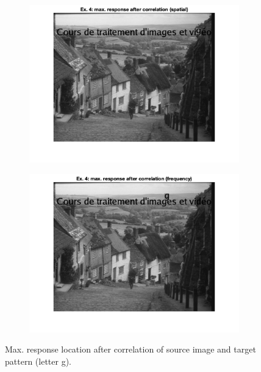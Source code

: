 \documentclass{article}
\begin{document}
\begin{figure}
    \centering
    \begin{subfigure}[c]{0.49\textwidth}
        \includegraphics[width=\textwidth]{images/corr_spatial.png}
    \end{subfigure}
    \hfill
    \begin{subfigure}[c]{0.49\textwidth}
        \includegraphics[width=\textwidth]{images/corr_freq.png}
    \end{subfigure}
    \caption{Max. response location after correlation of source image and target pattern (letter g).}
    \label{fig:correlation}
\end{figure}
\end{document}
